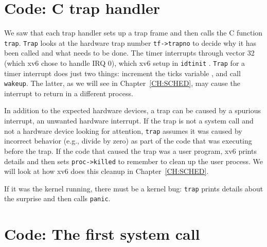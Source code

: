 {\section{Code: C trap handler}

We saw that each trap handler sets
up a trap frame and then calls the C function
\lstinline{trap}.
\lstinline{Trap}
looks at the hardware trap number
\lstinline{tf->trapno}
to decide why it has been called and what needs to be done.
The timer interrupts through vector 32 (which xv6 chose to handle IRQ
0), which xv6 setup in
\lstinline{idtinit} 
.
\lstinline{Trap}
for a timer interrupt does just two things:
increment the ticks variable 
, 
and call
\lstinline{wakeup}. 
The latter, as we will see in Chapter~\ref{CH:SCHED}, may cause the
interrupt to return in a different process.

In addition to the expected hardware
devices, a trap can be caused by a spurious interrupt, an unwanted
hardware interrupt.
If the trap is not a system call and not a hardware device looking for
attention,
\lstinline{trap}
assumes it was caused by incorrect behavior (e.g.,
divide by zero) as part of the code that was executing before the
trap.  
If the code that caused the trap was a user program, xv6 prints
details and then sets
\lstinline{proc->killed}
to remember to clean up the user process.
We will look at how xv6 does this cleanup in Chapter~\ref{CH:SCHED}.

If it was the kernel running, there must be a kernel bug:
\lstinline{trap}
prints details about the surprise and then calls
\lstinline{panic}.
\section{Code: The first system call}

}

